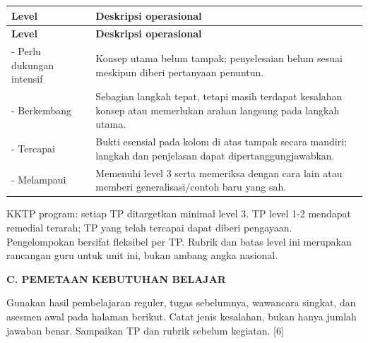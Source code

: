 \documentclass[11pt,a4paper]{article}
\begin{document}
{\small\setlength{\tabcolsep}{2mm}\renewcommand{\arraystretch}{1.35}\begin{longtable}{|>{\raggedright\arraybackslash}p{41.693mm}|>{\raggedright\arraybackslash}p{127.857mm}|}\hline
\rowcolor{gray!10}\textbf{Level} & \textbf{Deskripsi operasional}\\ \hline
\endfirsthead
\rowcolor{gray!10}\textbf{Level} & \textbf{Deskripsi operasional}\\ \hline
\endhead
1 - Perlu dukungan intensif & Konsep utama belum tampak; penyelesaian belum sesuai meskipun diberi pertanyaan penuntun.\\ \hline
2 - Berkembang & Sebagian langkah tepat, tetapi masih terdapat kesalahan konsep atau memerlukan arahan langsung pada langkah utama.\\ \hline
3 - Tercapai & Bukti esensial pada kolom di atas tampak secara mandiri; langkah dan penjelasan dapat dipertanggungjawabkan.\\ \hline
4 - Melampaui & Memenuhi level 3 serta memeriksa dengan cara lain atau memberi generalisasi/contoh baru yang sah.\\ \hline
\end{longtable}}\medskip
{\small KKTP program: setiap TP ditargetkan minimal level 3. TP level 1-2 mendapat remedial terarah; TP yang telah tercapai dapat diberi pengayaan. Pengelompokan bersifat fleksibel per TP. Rubrik dan batas level ini merupakan rancangan guru untuk unit ini, bukan ambang angka nasional.\par}\medskip
\clearpage
\begin{center}\bfseries\large C. PEMETAAN KEBUTUHAN BELAJAR\end{center}\medskip
Gunakan hasil pembelajaran reguler, tugas sebelumnya, wawancara singkat, dan asesmen awal pada halaman berikut. Catat jenis kesalahan, bukan hanya jumlah jawaban benar. Sampaikan TP dan rubrik sebelum kegiatan. [6]\par\medskip
\end{document}
